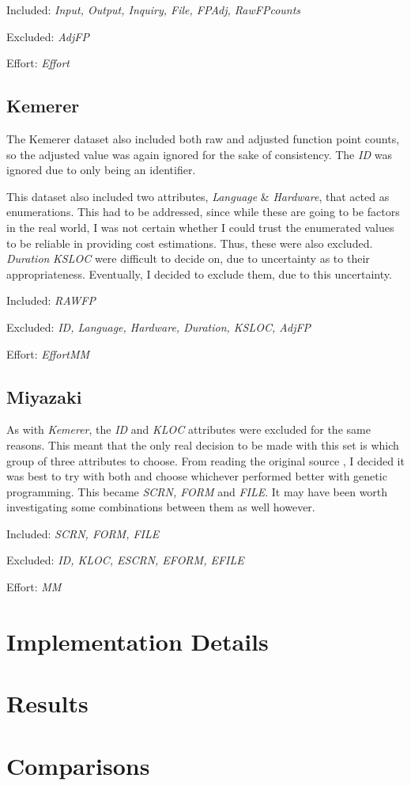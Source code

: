 \documentclass[11pt, a4paper]{article}
\begin{document}
Included: \emph{Input, Output, Inquiry, File, FPAdj, RawFPcounts}

Excluded: \emph{AdjFP}

Effort: \emph{Effort}

\subsection{Kemerer} %
\label{sub:kemerer}
The Kemerer dataset also included both raw and adjusted function point counts,
so the adjusted value was again ignored for the sake of consistency. The
\emph{ID} was ignored due to only being an identifier.

This dataset also included two attributes, \emph{Language} \& \emph{Hardware},
that acted as enumerations. This had to be addressed, since while these are going
to be factors in the real world, I was not certain whether I could trust the
enumerated values to be reliable in providing cost estimations. Thus, these were
also excluded. \emph{Duration} \emph{KSLOC} were difficult to decide on, due to
uncertainty as to their appropriateness. Eventually, I decided to exclude them,
due to this uncertainty.

Included: \emph{RAWFP}

Excluded: \emph{ID, Language, Hardware, Duration, KSLOC, AdjFP}

Effort: \emph{EffortMM}

\subsection{Miyazaki} %
\label{sub:miyazaki}
As with \emph{Kemerer}, the \emph{ID} and \emph{KLOC} attributes were excluded
for the same reasons. This meant that the only real decision to be made with
this set is which group of three attributes to choose. From reading the original
source \cite[Section~4.2]{MIYAZAKI19943}, I decided it was best to try with both
and choose whichever performed better with genetic programming. This became
\emph{SCRN, FORM} and \emph{FILE}. It may have been worth investigating some
combinations between them as well however.

Included: \emph{SCRN, FORM, FILE}

Excluded: \emph{ID, KLOC, ESCRN, EFORM, EFILE}

Effort: \emph{MM}

\section{Implementation Details} %
\label{sec:implementation_details}

\section{Results} %
\label{sec:results}

\section{Comparisons} %
\label{sec:comparisons}

 
\end{document}
